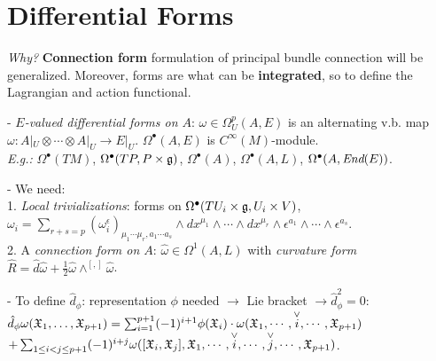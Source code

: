 \section{Differential Forms}

\begin{frame}
    \textit{Why?}\cite{Fournel2011, Lazzarini2012} \textbf{Connection form} formulation of principal bundle connection will be generalized. Moreover, forms are what can be \textbf{integrated}, so to define the Lagrangian and action functional.
    
    - \emph{$E$-valued differential forms on $A$}: $\omega \in \Omega_U^p(A, E)$ is an alternating v.b. map $\omega : A|_U \otimes \cdots \otimes A|_U \to E|_U$. $\Omega^\bullet(A, E)$ is $C^\infty(M)$-module.\\
    \textit{E.g.:} $\Omega^\bullet(TM)$, $\Omega^\bullet(TP, P \times \mathfrak{g})$, $\Omega^\bullet(A)$, $\Omega^\bullet(A, L)$, $\Omega^\bullet(A, \operatorname{\textit{End}}(E))$.
    
    - We need: \\
    1. \emph{Local trivializations}: forms on $\Omega^\bullet(TU_i \times \mathfrak{g}, U_i \times V)$, $\omega_i = \sum_{r + s = p} (\omega_i^\epsilon)_{\mu_1 \cdots \mu_r, a_1 \cdots a_s}\wedge dx^{\mu_1} \wedge \cdots \wedge dx^{\mu_r} \wedge \epsilon^{a_1} \wedge \cdots \wedge \epsilon^{a_s}$.\\
    2. A \emph{connection form on $A$}: $\hat \omega \in \Omega^1(A,L)$ with \emph{curvature form} $\hat R = \hat d \hat \omega + \frac{1}{2} \hat \omega \wedge^{[,]} \hat \omega$.
    
    - To define $\hat d_\phi$: representation $\phi$ needed $\to$ Lie bracket $\to \hat d_\phi^2 = 0$: 
    $\hat d_\phi \omega(\oid X_1, \dots, \oid X_{p+1}) = \sum_{i=1}^{p+1} (-1)^{i+1} \phi(\oid X_i)\cdot \omega(\oid X_1, \cdots, \overset{\vee}{i}, \cdots, \oid X_{p+1})$ \\
    $+ \sum_{1 \leq i < j \leq p+1} (-1)^{i+j}\omega([\mathfrak{X}_i, \mathfrak{X}_j], \mathfrak{X}_1, \cdots, \overset{\vee}{i}, \cdots, \overset{\vee}{j}, \cdots, \mathfrak{X}_{p+1})
    $.

\end{frame}

